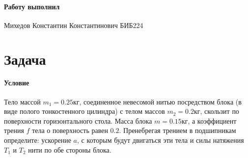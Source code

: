 \documentclass[a4paper,12pt]{article}
\begin{document}
    \paragraph{Работу выполнил} Михедов Константин Константинович БИБ224

    \section*{Задача }
 
    \paragraph{Условие} Тело массой $m_1 = 0.25$кг, соединенное невесомой нитью посредством блока
    (в виде полого тонкостенного цилиндра) с телом массов $m_2 = 0.2$кг, скользит по поверхности
    горизонтального стола. Масса блока $m = 0.15$кг, а коэффициент трения $f$ тела о поверхность
    равен $0.2$. Пренебрегая трением в подшипникам определите: ускорение $a$, с которым будут
    двигаться эти тела и силы натяжения $T_1$ и $T_2$ нити по обе стороны блока.
\end{document}
